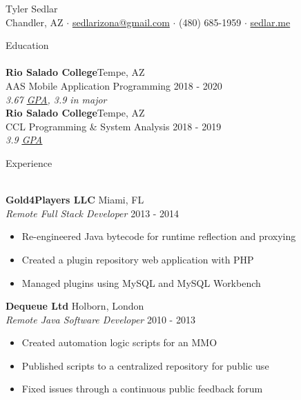 \documentclass[a4paper]{article}
\newcommand{\lineunder} {
    \vspace*{-8pt} \\
    \hspace*{-18pt} \hrulefill \\
}
\newcommand{\header} [1] {
    {\hspace*{-18pt}\vspace*{6pt} {#1}}
    \vspace*{-6pt} \lineunder
}
\begin{document}
\vspace*{-40pt}
\setul{}{0.25pt}

\vspace*{-10pt}
\begin{center}
	{\Huge {Tyler Sedlar}}\\
	Chandler, AZ $\cdot$ \href{mailto:sedlarizona@gmail.com}{sedlarizona@gmail.com} $\cdot$ (480) 685-1959 $\cdot$ \href{https://sedlar.me/}{sedlar.me}\\
\end{center}

\header{Education}
\textbf{Rio Salado College}\hfill Tempe, AZ\\
AAS Mobile Application Programming \hfill 2018 - 2020\\
\textit{3.67 \href{https://docs.google.com/spreadsheets/d/143DmVdsyjRVbH1ftcySxflvuNjioncAvJpj0vFbzpA8/edit?usp=sharing}{\ul{GPA}}, 3.9 in major}\\
\vspace{2mm}
\textbf{Rio Salado College}\hfill Tempe, AZ\\
CCL Programming \& System Analysis \hfill 2018 - 2019\\
\textit{3.9 \href{https://docs.google.com/spreadsheets/d/143DmVdsyjRVbH1ftcySxflvuNjioncAvJpj0vFbzpA8/edit?usp=sharing}{\ul{GPA}}}\\
\vspace{2mm}

\header{Experience}
\vspace{1mm}

\textbf{Gold4Players LLC} \hfill Miami, FL\\
\textit{Remote Full Stack Developer} \hfill 2013 - 2014\\
\vspace{-1mm}
\begin{itemize} \itemsep 1pt
	\item Re-engineered Java bytecode for runtime reflection and proxying
	\item Created a plugin repository web application with PHP
	\item Managed plugins using MySQL and MySQL Workbench
\end{itemize}
\textbf{Dequeue Ltd} \hfill Holborn, London\\
\textit{Remote Java Software Developer} \hfill 2010 - 2013\\
\vspace{-1mm}
\begin{itemize} \itemsep 1pt
    \item Created automation logic scripts for an MMO
	\item Published scripts to a centralized repository for public use
	\item Fixed issues through a continuous public feedback forum
\end{itemize}
\end{document}
